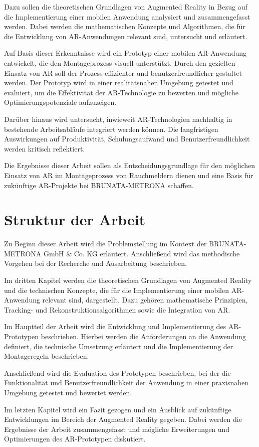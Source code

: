 Dazu sollen die theoretischen Grundlagen von Augmented Reality in Bezug auf die Implementierung einer mobilen Anwendung analysiert und zusammengefasst werden. Dabei werden die mathematischen Konzepte und Algorithmen, die für die Entwicklung von AR-Anwendungen relevant sind, untersucht und erläutert.

Auf Basis dieser Erkenntnisse wird ein Prototyp einer mobilen AR-Anwendung entwickelt, die den Montageprozess visuell unterstützt. Durch den gezielten Einsatz von AR soll der Prozess effizienter und benutzerfreundlicher gestaltet werden. Der Prototyp wird in einer realitätsnahen Umgebung getestet und evaluiert, um die Effektivität der AR-Technologie zu bewerten und mögliche Optimierungspotenziale aufzuzeigen.

Darüber hinaus wird untersucht, inwieweit AR-Technologien nachhaltig in bestehende Arbeitsabläufe integriert werden können. Die langfristigen Auswirkungen auf Produktivität, Schulungsaufwand und Benutzerfreundlichkeit werden kritisch reflektiert.

Die Ergebnisse dieser Arbeit sollen als Entscheidungsgrundlage für den möglichen Einsatz von AR im Montageprozess von Rauchmeldern dienen und eine Basis für zukünftige AR-Projekte bei BRUNATA-METRONA schaffen.

\section{Struktur der Arbeit}

Zu Beginn dieser Arbeit wird die Problemstellung im Kontext der BRUNATA-METRONA GmbH \& Co. KG erläutert. Anschließend wird das methodische Vorgehen bei der Recherche und Ausarbeitung beschrieben. 

Im dritten Kapitel werden die theoretischen Grundlagen von Augmented Reality und die technischen Konzepte, die für die Implementierung einer mobilen AR-Anwendung relevant sind, dargestellt. Dazu gehören mathematische Prinzipien, Tracking- und Rekonstruktionsalgorithmen sowie die Integration von AR.

Im Hauptteil der Arbeit wird die Entwicklung und Implementierung des AR-Prototypen beschrieben. Hierbei werden die Anforderungen an die Anwendung definiert, die technische Umsetzung erläutert und die Implementierung der Montageregeln beschrieben. 

Anschließend wird die Evaluation des Prototypen beschrieben, bei der die Funktionalität und Benutzerfreundlichkeit der Anwendung in einer praxisnahen Umgebung getestet und bewertet werden.

Im letzten Kapitel wird ein Fazit gezogen und ein Ausblick auf zukünftige Entwicklungen im Bereich der Augmented Reality gegeben. Dabei werden die Ergebnisse der Arbeit zusammengefasst und mögliche Erweiterungen und Optimierungen des AR-Prototypen diskutiert.

